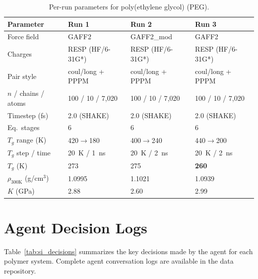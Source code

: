 \documentclass[journal=acsami,manuscript=suppinfo]{achemso}
\begin{document}
\begin{table}[H]
\centering
\caption{Per-run parameters for poly(ethylene glycol) (PEG).}
\label{tab:si_peg_params}
\small
\begin{tabular}{llll}
\toprule
\textbf{Parameter} & \textbf{Run 1} & \textbf{Run 2} & \textbf{Run 3} \\
\midrule
Force field & GAFF2 & GAFF2\_mod & GAFF2 \\
Charges & RESP (HF/6-31G*) & RESP (HF/6-31G*) & RESP (HF/6-31G*) \\
Pair style & coul/long + PPPM & coul/long + PPPM & coul/long + PPPM \\
$n$ / chains / atoms & 100 / 10 / 7{,}020 & 100 / 10 / 7{,}020 & 100 / 10 / 7{,}020 \\
Timestep (fs) & 2.0 (SHAKE) & 2.0 (SHAKE) & 2.0 (SHAKE) \\
Eq.\ stages & 6 & 6 & 6 \\
$T_g$ range (K) & 420$\to$180 & 400$\to$240 & 440$\to$200 \\
$T_g$ step / time & 20~K / 1~ns & 20~K / 2~ns & 20~K / 2~ns \\
\midrule
$T_g$ (K) & 273 & 275 & \textbf{260} \\
$\rho_{300\text{K}}$ (g/cm$^3$) & 1.0995 & 1.1021 & 1.0939 \\
$K$ (GPa) & 2.88 & 2.60 & 2.99 \\
\bottomrule
\end{tabular}
\end{table}


\section{Agent Decision Logs}
\label{sec:si_decision_logs}

Table~\ref{tab:si_decisions} summarizes the key decisions made by the agent for each polymer system.
Complete agent conversation logs are available in the data repository.
\end{document}
